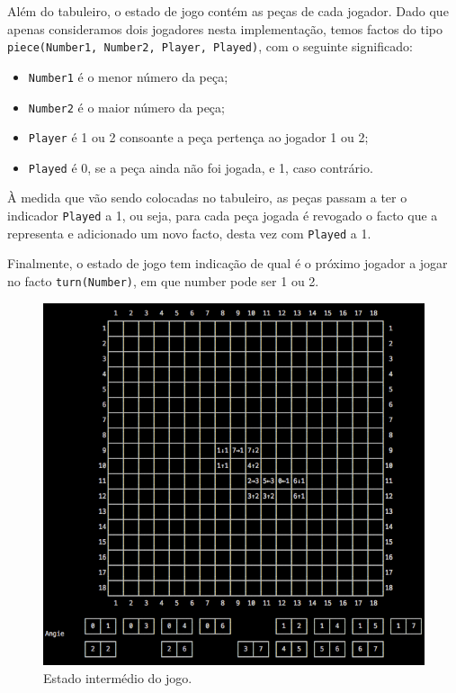 \documentclass[a4paper]{article}
\begin{document}
Além do tabuleiro, o estado de jogo contém as peças de cada jogador. Dado que apenas consideramos dois jogadores nesta implementação, temos factos do tipo \verb|piece(Number1, Number2, Player, Played)|, com o seguinte significado:
\begin{itemize}
	\item \verb|Number1| é o menor número da peça;
	\item \verb|Number2| é o maior número da peça;
	\item \verb|Player| é 1 ou 2 consoante a peça pertença ao jogador 1 ou 2;
	\item \verb|Played| é 0, se a peça ainda não foi jogada, e 1, caso contrário.
\end{itemize}
À medida que vão sendo colocadas no tabuleiro, as peças passam a ter o indicador \verb|Played| a 1, ou seja, para cada peça jogada é revogado o facto que a representa e adicionado um novo facto, desta vez com \verb|Played| a 1.

Finalmente, o estado de jogo tem indicação de qual é o próximo jogador a jogar no facto \verb|turn(Number)|, em que number pode ser 1 ou 2.

\begin{figure}[htbp]
\begin{center}
\includegraphics[scale=0.7]{intermediate.jpg}
\caption{Estado intermédio do jogo.}
\label{intermediate}
\end{center}
\end{figure}
\end{document}
